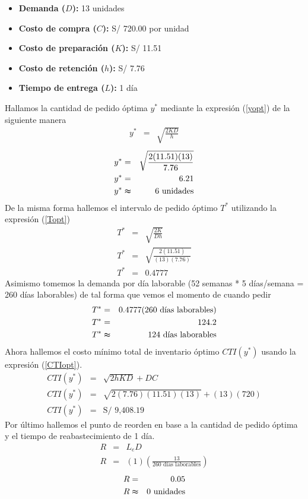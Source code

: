 \begin{itemize}
    \item \textbf{Demanda ($D$):} 13 unidades
    \item \textbf{Costo de compra ($C$):} S/ 720.00 por unidad
    \item \textbf{Costo de preparación ($K$):} S/ 11.51
    \item \textbf{Costo de retención ($h$):} S/ 7.76
    \item \textbf{Tiempo de entrega ($L$):} 1 día
\end{itemize}

Hallamos la cantidad de pedido óptima $y^*$ mediante la expresión (\ref{yopt}) de la siguiente manera
\begin{eqnarray}
    y^* &=& \sqrt{\frac{2KD}{h}} \nonumber
\end{eqnarray}
\begin{eqnarray}
    y^* &=& \sqrt{\frac{2(11.51)(13)}{7.76}} \nonumber \\
    y^* &=& 6.21 \nonumber \\
    y^* &\thickapprox& 6 \text{ unidades} \nonumber
\end{eqnarray}
De la misma forma hallemos el intervalo de pedido óptimo $T^*$ utilizando la expresión (\ref{Topt}) 
\begin{eqnarray}
    T^* &=& \sqrt{\frac{2K}{Dh}} \nonumber \\
    T^* &=& \sqrt{\frac{2(11.51)}{(13)(7.76)}} \nonumber \\
    T^* &=& 0.4777 \nonumber
\end{eqnarray}
Asimismo tomemos la demanda por día laborable (52 semanas * 5 días/semana = 260 días laborables) de tal forma que vemos el momento de cuando pedir
\begin{eqnarray}
    T^* &=& 0.4777 (260 \text{ días laborables}) \nonumber \\   
    T^* &=& 124.2 \nonumber \\
    T^* &\thickapprox& 124 \text{ días laborables} \nonumber
\end{eqnarray}
Ahora hallemos el costo mínimo total de inventario óptimo $CTI(y^*)$ usando la expresión (\ref{CTIopt}).
\begin{eqnarray}
    CTI(y^*) &=& \sqrt{2hKD} + DC \nonumber \\
    CTI(y^*) &=& \sqrt{2(7.76)(11.51)(13)} + (13)(720) \nonumber \\
    CTI(y^*) &=& \text{S/ 9,408.19} \nonumber
\end{eqnarray}
Por último hallemos el punto de reorden en base a la cantidad de pedido óptima y el tiempo de reabastecimiento de 1 día.
\begin{eqnarray}
    R &=& L_e D \nonumber \\
    R &=& (1) \left(\frac{13}{260 \text{ días laborables}} \right) \nonumber
\end{eqnarray}
\begin{eqnarray}
    R &=& 0.05 \nonumber \\
    R &\thickapprox& 0 \text{ unidades} \nonumber
\end{eqnarray}

